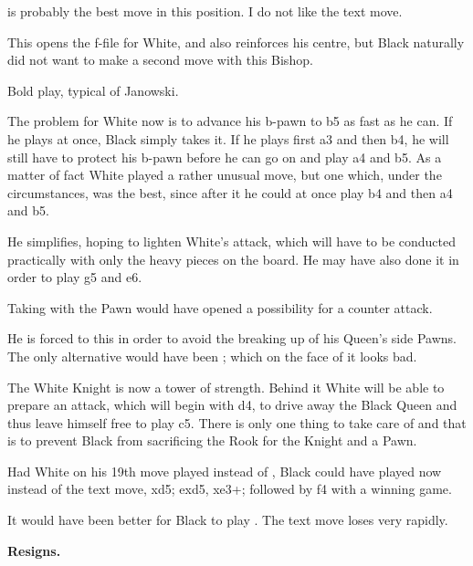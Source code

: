 \documentclass[10pt,twoside]{article}
\begin{document}

 is probably the best move in this position. I do not like the text move.


This opens the f-file for White, and also reinforces his centre, but Black naturally did not want to make a second move with this Bishop.


Bold play, typical of Janowski.


\board

The problem for White now is to advance his b-pawn to b5 as fast as he can. If he plays  at once, Black simply takes it. If he plays first a3 and then b4, he will still have to protect his b-pawn before he can go on and play a4 and b5. As a matter of fact White played a rather unusual move, but one which, under the circumstances, was the best, since after it he could at once play b4 and then a4 and b5.


He simplifies, hoping to lighten White's attack, which will have to be conducted practically with only the heavy pieces on the board. He may have also done it in order to play \figN g5 and e6.


Taking with the Pawn would have opened a possibility for a counter attack.


He is forced to this in order to avoid the breaking up of his Queen's side Pawns. The only alternative would have been ; which on the face of it looks bad.


\board

The White Knight is now a tower of strength. Behind it White will be able to prepare an attack, which will begin with d4, to drive away the Black Queen and thus leave himself free to play c5. There is only one thing to take care of and that is to prevent Black from sacrificing the Rook for the Knight and a Pawn.


Had White on his 19th move played  instead of , Black could have played now instead of the text move, \figR xd5; exd5, \figQ xe3+; followed by \figN f4 with a winning game.


It would have been better for Black to play . The text move loses very rapidly.


\noindent\textbf{Resigns.}
\end{document}
